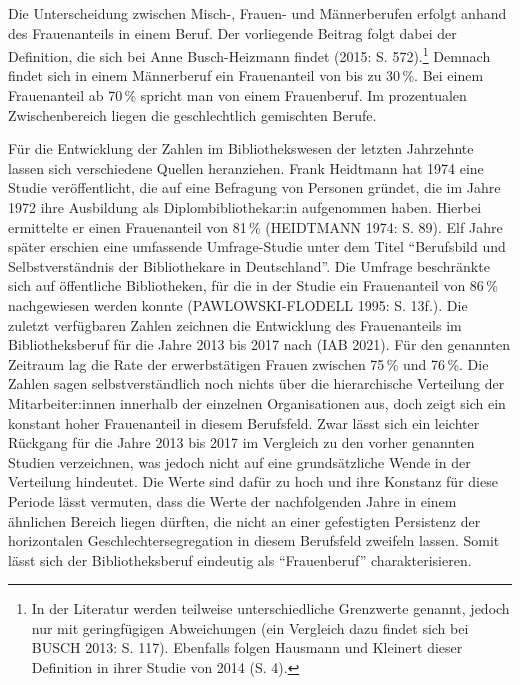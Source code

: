 \documentclass[a4paper,
fontsize=11pt,
oneside,
numbers=noperiodatend,
parskip=half-,
bibliography=totoc,
final
]{scrartcl}
\begin{document}
Die Unterscheidung zwischen Misch-, Frauen- und Männerberufen erfolgt
anhand des Frauenanteils in einem Beruf. Der vorliegende Beitrag folgt
dabei der Definition, die sich bei Anne Busch-Heizmann findet (2015: S.
572).\footnote{In der Literatur werden teilweise unterschiedliche
  Grenzwerte genannt, jedoch nur mit geringfügigen Abweichungen (ein
  Vergleich dazu findet sich bei BUSCH 2013: S. 117). Ebenfalls folgen
  Hausmann und Kleinert dieser Definition in ihrer Studie von 2014 (S.
  4).} Demnach findet sich in einem Männerberuf ein Frauenanteil von bis
zu 30\,\%. Bei einem Frauenanteil ab 70\,\% spricht man von einem
Frauenberuf. Im prozentualen Zwischenbereich liegen die geschlechtlich
gemischten Berufe.

Für die Entwicklung der Zahlen im Bibliothekswesen der letzten
Jahrzehnte lassen sich verschiedene Quellen heranziehen. Frank Heidtmann
hat 1974 eine Studie veröffentlicht, die auf eine Befragung von Personen
gründet, die im Jahre 1972 ihre Ausbildung als Diplombibliothekar:in
aufgenommen haben. Hierbei ermittelte er einen Frauenanteil von 81\,\%
(HEIDTMANN 1974: S. 89). Elf Jahre später erschien eine umfassende
Umfrage-Studie unter dem Titel \enquote{Berufsbild und Selbstverständnis
der Bibliothekare in Deutschland}. Die Umfrage beschränkte sich auf
öffentliche Bibliotheken, für die in der Studie ein Frauenanteil von
86\,\% nachgewiesen werden konnte (PAWLOWSKI-FLODELL 1995: S. 13f.). Die
zuletzt verfügbaren Zahlen zeichnen die Entwicklung des Frauenanteils im
Bibliotheksberuf für die Jahre 2013 bis 2017 nach (IAB 2021). Für den
genannten Zeitraum lag die Rate der erwerbstätigen Frauen zwischen 75\,\%
und 76\,\%. Die Zahlen sagen selbstverständlich noch nichts über die
hierarchische Verteilung der Mitarbeiter:innen innerhalb der einzelnen
Organisationen aus, doch zeigt sich ein konstant hoher Frauenanteil in
diesem Berufsfeld. Zwar lässt sich ein leichter Rückgang für die Jahre
2013 bis 2017 im Vergleich zu den vorher genannten Studien verzeichnen,
was jedoch nicht auf eine grundsätzliche Wende in der Verteilung
hindeutet. Die Werte sind dafür zu hoch und ihre Konstanz für diese
Periode lässt vermuten, dass die Werte der nachfolgenden Jahre in einem
ähnlichen Bereich liegen dürften, die nicht an einer gefestigten
Persistenz der horizontalen Geschlechtersegregation in diesem Berufsfeld
zweifeln lassen. Somit lässt sich der Bibliotheksberuf eindeutig als
\enquote{Frauenberuf} charakterisieren.
\end{document}
